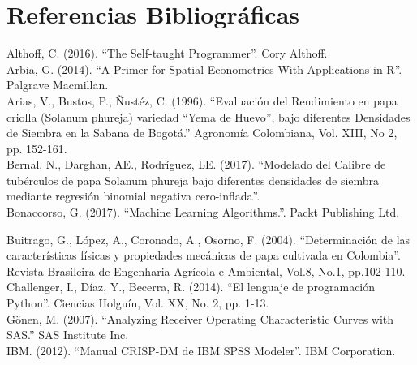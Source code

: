 
\chapter*{Referencias Bibliográficas}

\noindent
Althoff, C. (2016). "`The Self-taught Programmer"'. Cory Althoff.\\

\noindent
Arbia, G. (2014). "`A Primer for Spatial Econometrics With Applications in R"'. Palgrave Macmillan.\\

\noindent
Arias, V., Bustos, P., Ñustéz, C. (1996). "`Evaluación del Rendimiento en papa criolla (Solanum phureja) variedad "`Yema de Huevo"', bajo diferentes Densidades de Siembra en la Sabana de Bogotá."' Agronomía Colombiana, Vol. XIII, No 2, pp. 152-161.\\

\noindent
Bernal, N., Darghan, AE., Rodríguez, LE. (2017). "`Modelado del Calibre de tubérculos de papa Solanum phureja bajo diferentes densidades de siembra mediante regresión binomial negativa cero-inflada"'.\\

\noindent
Bonaccorso, G. (2017).  "`Machine Learning Algorithms."'. Packt Publishing Ltd.

\noindent
Buitrago, G., López, A., Coronado, A., Osorno, F. (2004). "`Determinación de las características físicas y propiedades mecánicas de papa cultivada en Colombia"'. Revista Brasileira de Engenharia Agrícola e Ambiental, Vol.8, No.1, pp.102-110.\\

\noindent
Challenger, I., Díaz, Y., Becerra, R. (2014). "`El lenguaje de programación Python"'. Ciencias Holguín, Vol. XX, No. 2, pp. 1-13.\\

\noindent
Gönen, M. (2007). "`Analyzing Receiver Operating Characteristic Curves with SAS."' SAS Institute Inc.\\

\noindent
IBM. (2012). "`Manual CRISP-DM de IBM SPSS Modeler"'. IBM Corporation.\\

